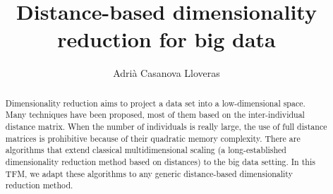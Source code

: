 \documentclass[a4paper,12pt]{article}
\title{Distance-based dimensionality reduction for big data}
\author{Adrià Casanova Lloveras}
\begin{document}


\begin{abstract}
    Dimensionality reduction aims to project a data set into a low-dimensional space. Many techniques have been proposed, most of them based on the inter-individual distance matrix. When the number of individuals is really large, the use of full distance matrices is prohibitive because of their quadratic memory complexity. There are algorithms that extend classical multidimensional scaling (a long-established dimensionality reduction method based on distances) to the big data setting. In this TFM, we adapt these algorithms to any generic distance-based dimensionality reduction method.
\end{abstract}
\pagebreak

\tableofcontents
\pagebreak


\pagebreak


\pagebreak


\pagebreak


\pagebreak


\pagebreak


\pagebreak


\pagebreak

\printbibliography
\pagebreak


\pagebreak
\end{document}

